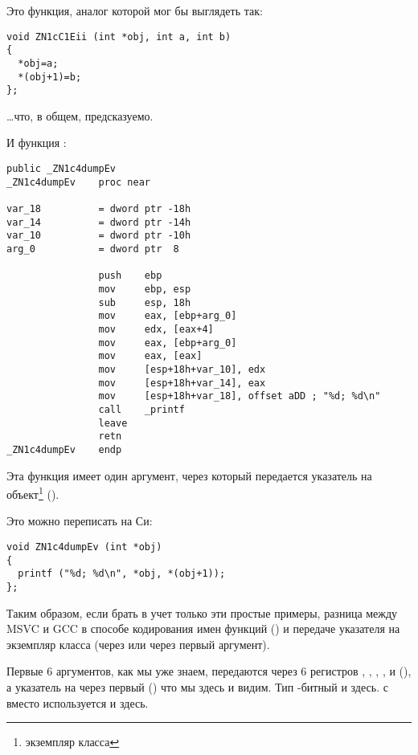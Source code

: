 Это функция, аналог которой мог бы выглядеть так:

\begin{lstlisting}[style=customc]
void ZN1cC1Eii (int *obj, int a, int b)
{
  *obj=a;
  *(obj+1)=b;
};
\end{lstlisting}

\dots что, в общем, предсказуемо.

И функция :

\begin{lstlisting}[style=customasm]
                public _ZN1c4dumpEv
_ZN1c4dumpEv    proc near

var_18          = dword ptr -18h
var_14          = dword ptr -14h
var_10          = dword ptr -10h
arg_0           = dword ptr  8

                push    ebp
                mov     ebp, esp
                sub     esp, 18h
                mov     eax, [ebp+arg_0]
                mov     edx, [eax+4]
                mov     eax, [ebp+arg_0]
                mov     eax, [eax]
                mov     [esp+18h+var_10], edx
                mov     [esp+18h+var_14], eax
                mov     [esp+18h+var_18], offset aDD ; "%d; %d\n"
                call    _printf
                leave
                retn
_ZN1c4dumpEv    endp
\end{lstlisting}

Эта функция  имеет один аргумент, через который передается указатель на 
объект\footnote{экземпляр класса} (\ITthis).

Это можно переписать на Си:

\begin{lstlisting}[style=customc]
void ZN1c4dumpEv (int *obj)
{
  printf ("%d; %d\n", *obj, *(obj+1));
};
\end{lstlisting}

Таким образом, если брать в учет только эти простые примеры, разница между MSVC и GCC 
в способе кодирования имен функций () и передаче указателя на экземпляр класса 
(через \ECX или через первый аргумент).


Первые 6 аргументов, как мы уже знаем, передаются через 6 регистров \RDI, \RSI, \RDX, \RCX,  и 
 (\SysVABI), а указатель на \ITthis через первый (\RDI) что мы здесь и видим.
Тип -битный и здесь.
 с \JMP вместо \RET используется и здесь.



